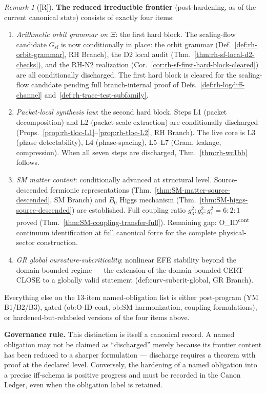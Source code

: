 \documentclass[12pt,oneside]{amsbook}
\theoremstyle{plain}
\theoremstyle{definition}
\theoremstyle{remark}
\newtheorem{remark}[theorem]{Remark}
\newcommand{\status}[1]{\textup{[#1]}}
\begin{document}
\begin{remark}[\status{R}]
\textbf{The reduced irreducible frontier} (post-hardening, as of the
current canonical state) consists of exactly four items:
\begin{enumerate}[label=\textup{(\arabic*)}]
  \item \emph{Arithmetic orbit grammar on $\Xi$}: the first hard
    block.  The scaling-flow candidate $G_{\mathrm{sf}}$ is now
    conditionally in place: the orbit grammar
    (Def.~\ref{def:rh-orbit-grammar}, RH Branch), the D2 local
    audit (Thm.~\ref{thm:rh-sf-local-d2-checks}), and the RH-N2
    realization (Cor.~\ref{cor:rh-sf-first-hard-block-cleared})
    are all conditionally discharged.  The first hard block is
    cleared for the scaling-flow candidate pending full
    branch-internal proof of Defs.~\ref{def:rh-logdiff-channel}
    and~\ref{def:rh-trace-test-subfamily}.
  \item \emph{Packet-local synthesis law}: the second hard block.
    Steps L1 (packet decomposition) and L2 (packet-scale
    extraction) are conditionally discharged
    (Props.~\ref{prop:rh-tloc-L1}--\ref{prop:rh-tloc-L2}, RH
    Branch).  The live core is L3 (phase detectability), L4
    (phase-spacing), L5--L7 (Gram, leakage, compression).
    When all seven steps are discharged,
    Thm.~\ref{thm:rh-wc1bb} follows.
  \item \emph{SM matter content}: conditionally advanced at
    structural level.  Source-descended fermionic representations
    (Thm.~\ref{thm:SM-matter-source-descended}, SM Branch) and
    $B_0$ Higgs mechanism (Thm.~\ref{thm:SM-higgs-source-descended})
    are established.  Full coupling ratio $g_3^2:g_2^2:g_1^2 = 6:2:1$
    proved (Thm.~\ref{thm:SM-coupling-transfer-full}).
    Remaining gap: O\_ID\textsuperscript{cont} continuum
    identification at full canonical force for the complete
    physical-sector construction.
  \item \emph{GR global curvature-subcriticality}: nonlinear EFE
    stability beyond the domain-bounded regime --- the extension of
    the domain-bounded CERT-CLOSE to a globally valid statement
    (def:curv-subcrit-global, GR Branch).
\end{enumerate}

Everything else on the 13-item named-obligation list is either
post-program (YM B1/B2/B3), gated (ob:O-ID-cont, ob:SM-harmonization,
coupling formulations), or hardened-but-relabeled versions of the
four items above.

\textbf{Governance rule.}
This distinction is itself a canonical record.  A named obligation
may not be claimed as ``discharged'' merely because its frontier
content has been reduced to a sharper formulation --- discharge
requires a theorem with proof at the declared level.  Conversely,
the hardening of a named obligation into a precise iff-schema
is positive progress and must be recorded in the Canon Ledger,
even when the obligation label is retained.


\end{remark}
\end{document}
